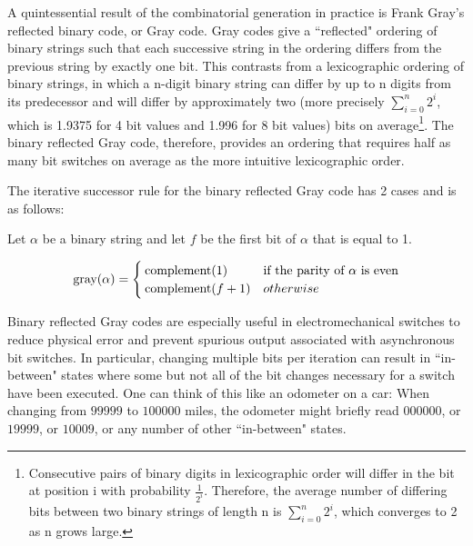 A quintessential result of the combinatorial generation in practice is Frank Gray's reflected binary code, or Gray code. Gray codes give a ``reflected" ordering of binary strings such that each successive string in the ordering differs from the previous string by exactly one bit. This contrasts from a lexicographic ordering of binary strings, in which a n-digit binary string can differ by up to n digits from its predecessor and will differ by approximately two (more precisely $\sum_{i=0}^n2^i$, which is 1.9375 for 4 bit values and 1.996 for 8 bit values) bits on average\footnote{Consecutive pairs of binary digits in lexicographic order will differ in the bit at position i with probability $\frac{1}{2^i}$.  Therefore, the average number of differing bits between two binary strings of length n is $\sum_{i=0}^n2^i$, which converges to 2 as n grows large.}. The binary reflected Gray code, therefore, provides an ordering that requires half as many bit switches on average as the more intuitive lexicographic order. 

The iterative successor rule for the binary reflected Gray code has 2 cases and is as follows:


Let $\alpha$ be a binary string and let $f$ be the first bit of $\alpha$ that is equal to 1.

\begin{equation} \label{eq:BRGC-rule}
    \text{gray}(\alpha) = \begin{cases} 
        \operatorname{complement}(1) & \text{if the parity of $\alpha$ is even}\\
        \operatorname{complement}(f+1) & otherwise\\
\end{cases}
\end{equation}

Binary reflected Gray codes are especially useful in electromechanical switches to reduce physical error and prevent spurious output associated with asynchronous bit switches.  In particular, changing multiple bits per iteration can result in ``in-between" states where some but not all of the bit changes necessary for a switch have been executed.  One can think of this like an odometer on a car: When changing from $99999$ to $100000$ miles, the odometer might briefly read $000000$, or $19999$, or $10009$, or any number of other ``in-between" states. 

